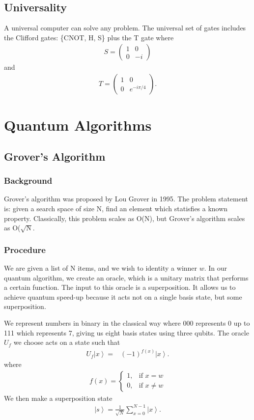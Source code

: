 \documentclass[11pt]{article} %
\newcommand{\ket}[1]{\left|#1\right\rangle}
\begin{document}
\subsection{Universality}
A universal computer can solve any problem. The universal set of gates includes the Clifford gates: \{CNOT, H, S\} plus the T gate where
\begin{align}
    S =
    \begin{pmatrix}
        1 & 0\\
        0 & -i
    \end{pmatrix}
\end{align}
and
\begin{align}
    T =
    \begin{pmatrix}
        1 & 0\\
        0 & e^{-i\pi/4}
    \end{pmatrix}.
\end{align}

\section{Quantum Algorithms}
\subsection{Grover's Algorithm}
\subsubsection{Background}
Grover's algorithm was proposed by Lou Grover in 1995. The problem statement is: given a search space of size N, find an element which statisfies a known property. Classically, this problem scales as O(N), but Grover's algorithm scales as O($\sqrt{\textrm{N}}$.

\subsubsection{Procedure}
We are given a list of N items, and we wish to identity a winner $w$. In our quantum algorithm, we create an oracle, which is a unitary matrix that performs a certain function. The input to this oracle is a superposition. It allows us to achieve quantum speed-up because it acts not on a single basis state, but some superposition.

We represent numbers in binary in the classical way where 000 represents 0 up to 111 which represents 7, giving us eight basis states using three qubits. The oracle $U_f$ we choose acts on a state such that
\begin{align}
    U_f\ket{x} =& (-1)^{f(x)}\ket{x}.
\end{align}
where
\begin{align}
    f(x)= 
    \begin{cases}
        1, & \text{if } x = w\\
        0, & \text{if } x \neq w
    \end{cases}
\end{align}
We then make a superposition state
\begin{align}
    \ket{s} = \frac{1}{\sqrt{N}}\sum^{N-1}_{x=0}\ket{x}.
\end{align}
\end{document}
